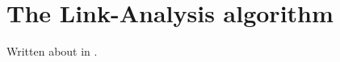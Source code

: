 \section{The Link-Analysis algorithm}\label{sec:linkanalysis}

Written about in \cite{huang2007comparison}.

